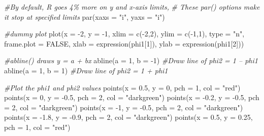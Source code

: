 \documentclass[
]{book}
\newenvironment{Shaded}{\begin{snugshade}}{\end{snugshade}}
\newcommand{\AttributeTok}[1]{\textcolor[rgb]{0.77,0.63,0.00}{#1}}
\newcommand{\CommentTok}[1]{\textcolor[rgb]{0.56,0.35,0.01}{\textit{#1}}}
\newcommand{\ConstantTok}[1]{\textcolor[rgb]{0.00,0.00,0.00}{#1}}
\newcommand{\DecValTok}[1]{\textcolor[rgb]{0.00,0.00,0.81}{#1}}
\newcommand{\FloatTok}[1]{\textcolor[rgb]{0.00,0.00,0.81}{#1}}
\newcommand{\FunctionTok}[1]{\textcolor[rgb]{0.00,0.00,0.00}{#1}}
\newcommand{\NormalTok}[1]{#1}
\newcommand{\SpecialCharTok}[1]{\textcolor[rgb]{0.00,0.00,0.00}{#1}}
\newcommand{\StringTok}[1]{\textcolor[rgb]{0.31,0.60,0.02}{#1}}
\theoremstyle{definition}
\theoremstyle{definition}
\theoremstyle{definition}
\theoremstyle{definition}
\theoremstyle{remark}
\begin{document}
\begin{Shaded}
\begin{Highlighting}[]
\CommentTok{\#By default, R goes 4\% more on y and x{-}axis limits,}
\CommentTok{\#  These par() options make it stop at specified limits }
\FunctionTok{par}\NormalTok{(}\AttributeTok{xaxs =} \StringTok{"i"}\NormalTok{, }\AttributeTok{yaxs =} \StringTok{"i"}\NormalTok{)}

\CommentTok{\#dummy plot}
\FunctionTok{plot}\NormalTok{(}\AttributeTok{x =} \SpecialCharTok{{-}}\DecValTok{2}\NormalTok{, }\AttributeTok{y =} \SpecialCharTok{{-}}\DecValTok{1}\NormalTok{, }\AttributeTok{xlim =} \FunctionTok{c}\NormalTok{(}\SpecialCharTok{{-}}\DecValTok{2}\NormalTok{,}\DecValTok{2}\NormalTok{), }\AttributeTok{ylim =} \FunctionTok{c}\NormalTok{(}\SpecialCharTok{{-}}\DecValTok{1}\NormalTok{,}\DecValTok{1}\NormalTok{), }
    \AttributeTok{type =} \StringTok{"n"}\NormalTok{, }\AttributeTok{frame.plot =} \ConstantTok{FALSE}\NormalTok{, }\AttributeTok{xlab =} 
     \FunctionTok{expression}\NormalTok{(phi1[}\DecValTok{1}\NormalTok{]), }\AttributeTok{ylab =} \FunctionTok{expression}\NormalTok{(phi1[}\DecValTok{2}\NormalTok{])) }

\CommentTok{\#abline() draws y = a + bx       }
\FunctionTok{abline}\NormalTok{(}\AttributeTok{a =} \DecValTok{1}\NormalTok{, }\AttributeTok{b =} \SpecialCharTok{{-}}\DecValTok{1}\NormalTok{) }\CommentTok{\#Draw line of phi2 = 1 – phi1}
\FunctionTok{abline}\NormalTok{(}\AttributeTok{a =} \DecValTok{1}\NormalTok{, }\AttributeTok{b =}  \DecValTok{1}\NormalTok{) }\CommentTok{\#Draw line of phi2 = 1 + phi1}

\CommentTok{\#Plot the phi1 and phi2 values }
\FunctionTok{points}\NormalTok{(}\AttributeTok{x =} \FloatTok{0.5}\NormalTok{, }\AttributeTok{y =} \DecValTok{0}\NormalTok{, }\AttributeTok{pch =} \DecValTok{1}\NormalTok{, }\AttributeTok{col =} \StringTok{"red"}\NormalTok{) }
\FunctionTok{points}\NormalTok{(}\AttributeTok{x =} \DecValTok{0}\NormalTok{, }\AttributeTok{y =} \SpecialCharTok{{-}}\FloatTok{0.5}\NormalTok{, }\AttributeTok{pch =} \DecValTok{2}\NormalTok{, }\AttributeTok{col =} \StringTok{"darkgreen"}\NormalTok{)}
\FunctionTok{points}\NormalTok{(}\AttributeTok{x =} \SpecialCharTok{{-}}\FloatTok{0.2}\NormalTok{, }\AttributeTok{y =} \SpecialCharTok{{-}}\FloatTok{0.5}\NormalTok{, }\AttributeTok{pch =} \DecValTok{2}\NormalTok{, }\AttributeTok{col =} \StringTok{"darkgreen"}\NormalTok{)}
\FunctionTok{points}\NormalTok{(}\AttributeTok{x =} \SpecialCharTok{{-}}\DecValTok{1}\NormalTok{, }\AttributeTok{y =} \SpecialCharTok{{-}}\FloatTok{0.5}\NormalTok{, }\AttributeTok{pch =} \DecValTok{2}\NormalTok{, }\AttributeTok{col =} \StringTok{"darkgreen"}\NormalTok{)}
\FunctionTok{points}\NormalTok{(}\AttributeTok{x =} \SpecialCharTok{{-}}\FloatTok{1.8}\NormalTok{, }\AttributeTok{y =} \SpecialCharTok{{-}}\FloatTok{0.9}\NormalTok{, }\AttributeTok{pch =} \DecValTok{2}\NormalTok{, }\AttributeTok{col =} \StringTok{"darkgreen"}\NormalTok{)}
\FunctionTok{points}\NormalTok{(}\AttributeTok{x =} \FloatTok{0.5}\NormalTok{, }\AttributeTok{y =} \FloatTok{0.25}\NormalTok{, }\AttributeTok{pch =} \DecValTok{1}\NormalTok{, }\AttributeTok{col =} \StringTok{"red"}\NormalTok{)}
   

\end{Highlighting}
\end{Shaded}
\end{document}
